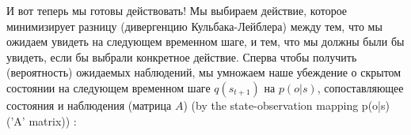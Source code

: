 \documentclass[twoside,leqno, 11pt]{article}
\begin{document}
	
	И вот теперь мы готовы действовать! Мы выбираем действие, которое минимизирует разницу (дивергенцию Кульбака-Лейблера) между тем, что мы ожидаем увидеть на следующем временном шаге, и тем, что мы должны были бы увидеть, если бы выбрали конкретное действие. Сперва чтобы получить (вероятность) ожидаемых наблюдений, мы умножаем наше убеждение о скрытом состоянии на следующем временном шаге $q(s_{t+1})$ на $p(o|s)$, сопоставляющее состояния и наблюдения (матрица $A$) (by the state-observation mapping p(o|s) ('A' matrix)) :
	
	\begin{figure}[h]
	\end{figure}
	
	
\end{document}
